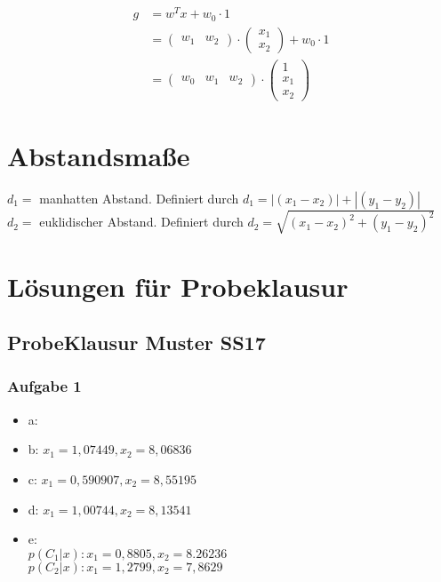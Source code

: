 \documentclass{article}
\begin{document}
\begin{equation}
\begin{aligned}
	g &= w^T x+ w_{0} \cdot 1
	\\
	&= \begin{pmatrix}
	w_1 & w_2
	\end{pmatrix}
	\cdot
	\begin{pmatrix}
	x_1\\
	x_2
	\end{pmatrix}
	+ w_0 \cdot 1
	\\
	&= \begin{pmatrix}
	w_0 & w_1 & w_2 
	\end{pmatrix}
		\cdot
	\begin{pmatrix}
	1\\
	x_1\\
	x_2
	\end{pmatrix}
\end{aligned}
\end{equation}

\section{Abstandsmaße}
$d_1 =$ manhatten Abstand. Definiert durch $d_1 = |(x_1 - x_2)| + |(y_1 - y_2)|$
\\
$d_2 =$ euklidischer Abstand. Definiert durch $d_2=\sqrt{(x_1 - x_2)^2+(y_1 - y_2)^2}$
\\



\section{Lösungen für Probeklausur}

\subsection{ProbeKlausur Muster SS17}

\subsubsection{Aufgabe 1}

\begin{itemize}
	\item a:
	\item b: $x_1 = 1,07449 , x_2 = 8,06836$
	\item c: $x_1 = 0,590907 , x_2 = 8,55195$
	\item d: $x_1 = 1,00744 , x_2 = 8,13541$
	\item e: \\$p(C_1 | x) : x_1 = 0,8805 , x_2 = 8.26236$ \\ 		$p(C_2| x) : x_1 = 1,2799 , x_2 = 7,8629$
\end{itemize}
\end{document}
